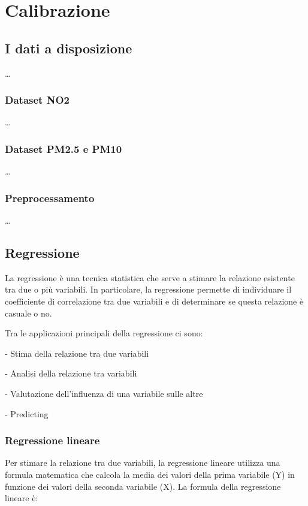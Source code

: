 \chapter{Calibrazione}\label{ch:calibrazione}

\section{I dati a disposizione}\label{sec:dati}
\ldots

\subsection{Dataset NO2}\label{ssec:dataset-no2}
\ldots

\subsection{Dataset PM2.5 e PM10}\label{ssec:dataset-pm}
\ldots

\subsection{Preprocessamento}\label{ssec:preprocessamento}
\ldots

\section{Regressione}\label{sec:regressione}
La regressione è una tecnica statistica che serve a stimare la relazione esistente tra due o più variabili. In particolare, la regressione permette di individuare il coefficiente di correlazione tra due variabili e di determinare se questa relazione è casuale o no.

Tra le applicazioni principali della regressione ci sono:

- Stima della relazione tra due variabili

- Analisi della relazione tra variabili

- Valutazione dell'influenza di una variabile sulle altre

- Predicting

\subsection{Regressione lineare}\label{ssec:regressione-lineare}
Per stimare la relazione tra due variabili, la regressione lineare utilizza una formula matematica che calcola la media dei valori della prima variabile (Y) in funzione dei valori della seconda variabile (X). La formula della regressione lineare è:

